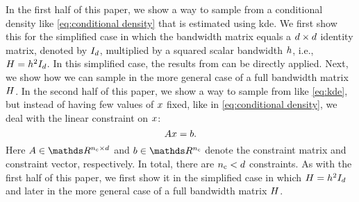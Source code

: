 In the first half of this paper, we show a way to sample from a conditional density like \cref{eq:conditional density} that is estimated using \ac{kde}. 
We first show this for the simplified case in which the bandwidth matrix equals a $d\times d$ identity matrix, denoted by $I_{d}$, multiplied by a squared scalar bandwidth $h$, i.e., $H=h^2 I_{d}$. 
In this simplified case, the results from \textcite{hyndman1996estimating, holmes2007fast} can be directly applied.
Next, we show how we can sample in the more general case of a full bandwidth matrix $H$.
In the second half of this paper, we show a way to sample from  like \cref{eq:kde}, but instead of having few values of $x$ fixed, like in \cref{eq:conditional density}, we deal with the linear constraint on $x$:
\begin{equation}
	\label{eq:linear constraint}
	A x = b.
\end{equation}
Here $\constraintmatrix \in \realnumbers^{\numberofconstraints \times \dimension}$ and $\constraintvector \in \realnumbers^{\numberofconstraints}$ denote the constraint matrix and constraint vector, respectively. 
In total, there are $n_\mathrm{c} < d$ constraints.
As with the first half of this paper, we first show it in the simplified case in which $H=h^2 I_{d}$ and later in the more general case of a full bandwidth matrix $H$.
